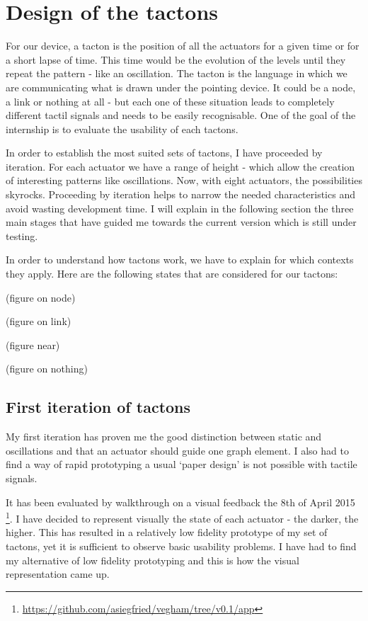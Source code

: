 \section{Design of the tactons}\label{design-of-the-tactons}

For our device, a tacton is the position of all the actuators for a
given time or for a short lapse of time. This time would be the
evolution of the levels until they repeat the pattern - like an
oscillation. The tacton is the language in which we are communicating
what is drawn under the pointing device. It could be a node, a link or
nothing at all - but each one of these situation leads to completely
different tactil signals and needs to be easily recognisable. One of the
goal of the internship is to evaluate the usability of each tactons.

In order to establish the most suited sets of tactons, I have proceeded
by iteration. For each actuator we have a range of height - which allow
the creation of interesting patterns like oscillations. Now, with eight
actuators, the possibilities skyrocks. Proceeding by iteration helps to
narrow the needed characteristics and avoid wasting development time. I
will explain in the following section the three main stages that have
guided me towards the current version which is still under testing.

In order to understand how tactons work, we have to explain for which
contexts they apply. Here are the following states that are considered
for our tactons:

(figure on node)

(figure on link)

(figure near)

(figure on nothing)

\subsection{First iteration of
tactons}\label{first-iteration-of-tactons}

My first iteration has proven me the good distinction between static and
oscillations and that an actuator should guide one graph element. I also
had to find a way of rapid prototyping a usual `paper design' is not
possible with tactile signals.

It has been evaluated by walkthrough on a visual feedback the 8th of
April 2015 \footnote{\url{https://github.com/asiegfried/vegham/tree/v0.1/app}}.
I have decided to represent visually the state of each actuator - the
darker, the higher. This has resulted in a relatively low fidelity
prototype of my set of tactons, yet it is sufficient to observe basic
usability problems. I have had to find my alternative of low fidelity
prototyping and this is how the visual representation came up.

